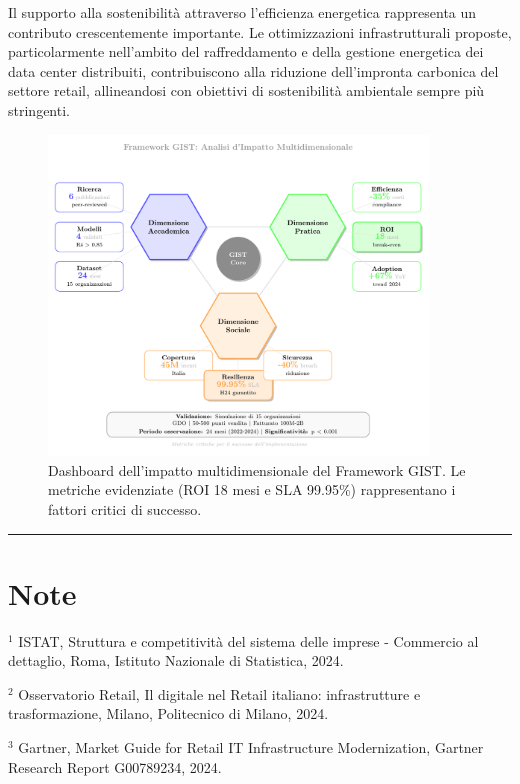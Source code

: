 \documentclass[12pt,a4paper,oneside]{book}
\numberwithin{figure}{chapter} %
\numberwithin{table}{chapter}  %
\begin{document}
Il supporto alla sostenibilità attraverso l'efficienza energetica
rappresenta un contributo crescentemente importante. Le ottimizzazioni
infrastrutturali proposte, particolarmente nell'ambito del
raffreddamento e della gestione energetica dei data center distribuiti,
contribuiscono alla riduzione dell'impronta carbonica del settore
retail, allineandosi con obiettivi di sostenibilità ambientale sempre
più stringenti.
\begin{figure}[htbp]
    \centering
    \includegraphics[width=0.9\textwidth]{figura 1-5}
    \caption{Dashboard dell'impatto multidimensionale del Framework GIST. Le metriche evidenziate (ROI 18 mesi e SLA 99.95\%) rappresentano i fattori critici di successo.}
    \label{fig:impatto_gist}
\end{figure}

\begin{center}\rule{0.5\linewidth}{0.5pt}\end{center}
\newpage
\section{\texorpdfstring{\textbf{Note}}{Note}}\label{note}

$^1$ ISTAT, Struttura e competitività del sistema delle imprese - Commercio
al dettaglio, Roma, Istituto Nazionale di Statistica, 2024.

$^2$ Osservatorio Retail, Il digitale nel Retail italiano: infrastrutture e
trasformazione, Milano, Politecnico di Milano, 2024.

$^3$ Gartner, Market Guide for Retail IT Infrastructure Modernization,
Gartner Research Report G00789234, 2024.
\end{document}
